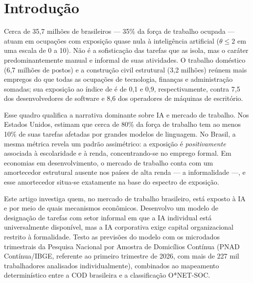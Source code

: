 \section{Introdução}
\label{sec:intro}

Cerca de 35{,}7 milhões de brasileiros --- 35\% da força de trabalho ocupada --- atuam em ocupações com exposição quase nula à inteligência artificial ($\theta \le 2$ em uma escala de 0 a 10). Não é a sofisticação das tarefas que as isola, mas o caráter predominantemente manual e informal de suas atividades. O trabalho doméstico (6{,}7 milhões de postos) e a construção civil estrutural (3{,}2 milhões) reúnem mais empregos do que todas as ocupações de tecnologia, finanças e administração somadas; sua exposição ao índice de \citet{eloundou2024gpts} é de 0{,}1 e 0{,}9, respectivamente, contra 7{,}5 dos desenvolvedores de software e 8{,}6 dos operadores de máquinas de escritório.

Esse quadro qualifica a narrativa dominante sobre IA e mercado de trabalho. Nos Estados Unidos, \citet{eloundou2024gpts} estimam que cerca de 80\% da força de trabalho tem ao menos 10\% de suas tarefas afetadas por grandes modelos de linguagem. No Brasil, a mesma métrica revela um padrão assimétrico: a exposição é \emph{positivamente} associada à escolaridade e à renda, concentrando-se no emprego formal. Em economias em desenvolvimento, o mercado de trabalho conta com um amortecedor estrutural ausente nos países de alta renda --- a informalidade \citep{gmyrek2023generative} ---, e esse amortecedor situa-se exatamente na base do espectro de exposição.

Este artigo investiga quem, no mercado de trabalho brasileiro, está exposto à IA e por meio de quais mecanismos econômicos. Desenvolvo um modelo de designação de tarefas com setor informal em que a IA individual está universalmente disponível, mas a IA corporativa exige capital organizacional restrito à formalidade. Testo as previsões do modelo com os microdados trimestrais da Pesquisa Nacional por Amostra de Domicílios Contínua (PNAD Contínua/IBGE, referente ao primeiro trimestre de 2026, com mais de 227 mil trabalhadores analisados individualmente), combinados ao mapeamento determinístico entre a COD brasileira e a classificação O*NET-SOC.

